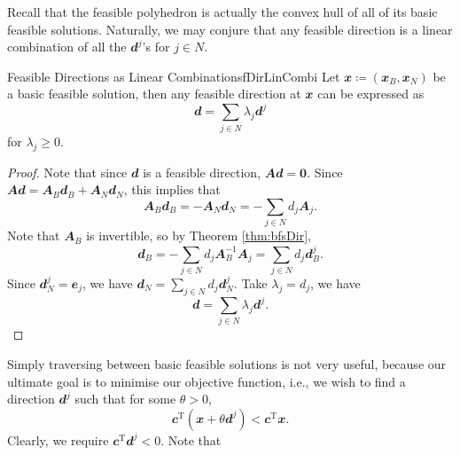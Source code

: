 \documentclass[math, code]{amznotes}
\theoremstyle{remark}
\begin{document}
Recall that the feasible polyhedron is actually the convex hull of all of its basic feasible solutions. Naturally, we may conjure that any feasible direction is a linear combination of all the $\mathbfit{d}^j$'s for $j \in N$.
\begin{probox}{Feasible Directions as Linear Combinations}{fDirLinCombi}
    Let $\mathbfit{x} \coloneqq \left(\mathbfit{x}_B, \mathbfit{x}_N\right)$ be a basic feasible solution, then any feasible direction at $\mathbfit{x}$ can be expressed as 
    \begin{equation*}
        \mathbfit{d} = \sum_{j \in N}\lambda_j\mathbfit{d}^j
    \end{equation*}
    for $\lambda_j \geq 0$.
    \tcblower
    \begin{proof}
        Note that since $\mathbfit{d}$ is a feasible direction, $\mathbfit{Ad} = \mathbf{0}$. Since $\mathbfit{Ad} = \mathbfit{A}_B\mathbfit{d}_B + \mathbfit{A}_N\mathbfit{d}_N$, this implies that 
        \begin{equation*}
            \mathbfit{A}_B\mathbfit{d}_B = -\mathbfit{A}_N\mathbfit{d}_N = -\sum_{j \in N}d_j\mathbfit{A}_j.
        \end{equation*}
        Note that $\mathbfit{A}_B$ is invertible, so by Theorem \ref{thm:bfsDir}, 
        \begin{equation*}
            \mathbfit{d}_B = -\sum_{j \in N}d_j\mathbfit{A}_B^{-1}\mathbfit{A}_j = \sum_{j \in N}d_j\mathbfit{d}_B^j.
        \end{equation*}
        Since $\mathbfit{d}_N^j = \mathbfit{e}_j$, we have $\mathbfit{d}_N = \sum_{j \in N}d_j\mathbfit{d}_N^j$. Take $\lambda_j = d_j$, we have
        \begin{equation*}
            \mathbfit{d} = \sum_{j \in N}\lambda_j\mathbfit{d}^j.
        \end{equation*}
    \end{proof}
\end{probox}
Simply traversing between basic feasible solutions is not very useful, because our ultimate goal is to minimise our objective function, i.e., we wish to find a direction $\mathbfit{d}^j$ such that for some $\theta > 0$,
\begin{equation*}
    \mathbfit{c}^{\mathrm{T}}\left(\mathbfit{x} + \theta\mathbfit{d}^j\right) < \mathbfit{c}^{\mathrm{T}}\mathbfit{x}.
\end{equation*}
Clearly, we require $\mathbfit{c}^{\mathrm{T}}\mathbfit{d}^j < 0$. Note that
\end{document}
